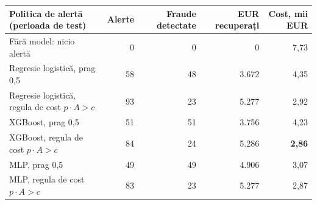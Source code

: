 \begin{tabular}{lrrrr}
\toprule
Politica de alertă (perioada de test) & Alerte & Fraude detectate & EUR recuperați & Cost, mii EUR \\
\midrule
Fără model: nicio alertă & 0 & 0 & 0 & 7,73 \\
Regresie logistică, prag 0,5 & 58 & 48 & 3.672 & 4,35 \\
Regresie logistică, regula de cost $p\cdot A>c$ & 93 & 23 & 5.277 & 2,92 \\
XGBoost, prag 0,5 & 51 & 51 & 3.756 & 4,23 \\
XGBoost, regula de cost $p\cdot A>c$ & 84 & 24 & 5.286 & \textbf{2,86} \\
MLP, prag 0,5 & 49 & 49 & 4.906 & 3,07 \\
MLP, regula de cost $p\cdot A>c$ & 83 & 23 & 5.277 & 2,87 \\
\bottomrule
\end{tabular}
